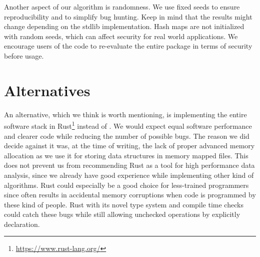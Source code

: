 Another aspect of our algorithm is randomness. We use fixed seeds to ensure reproducibility and to simplify bug hunting. Keep in mind that the results might change depending on the stdlib implementation. Hash maps are not initialized with random seeds, which can affect security for real world applications. We encourage users of the code to re-evaluate the entire package in terms of security before usage.



\section{Alternatives}
\label{sec:implementation:alternatives}

An alternative, which we think is worth mentioning, is implementing the entire software stack in Rust\footnote{\url{https://www.rust-lang.org/}} instead of \Cpp{}. We would expect equal software performance and clearer code while reducing the number of possible bugs. The reason we did decide against it was, at the time of writing, the lack of proper advanced memory allocation as we use it for storing data structures in memory mapped files. This does not prevent us from recommending Rust as a tool for high performance data analysis, since we already have good experience while implementing other kind of algorithms. Rust could especially be a good choice for less-trained programmers since \Cpp{} often results in accidental memory corruptions when code is programmed by these kind of people. Rust with its novel type system and compile time checks could catch these bugs while still allowing unchecked operations by explicitly declaration.
